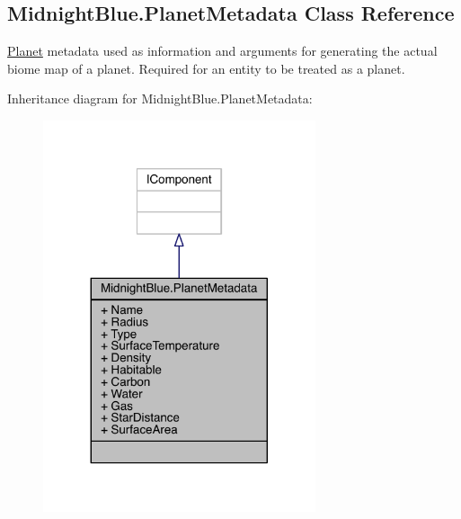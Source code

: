 \hypertarget{class_midnight_blue_1_1_planet_metadata}{}\subsection{Midnight\+Blue.\+Planet\+Metadata Class Reference}
\label{class_midnight_blue_1_1_planet_metadata}


\hyperlink{class_midnight_blue_1_1_planet}{Planet} metadata used as information and arguments for generating the actual biome map of a planet. Required for an entity to be treated as a planet.  




Inheritance diagram for Midnight\+Blue.\+Planet\+Metadata\+:\nopagebreak
\begin{figure}[H]
\begin{center}
\leavevmode
\includegraphics[width=227pt]{class_midnight_blue_1_1_planet_metadata__inherit__graph}
\end{center}
\end{figure}


